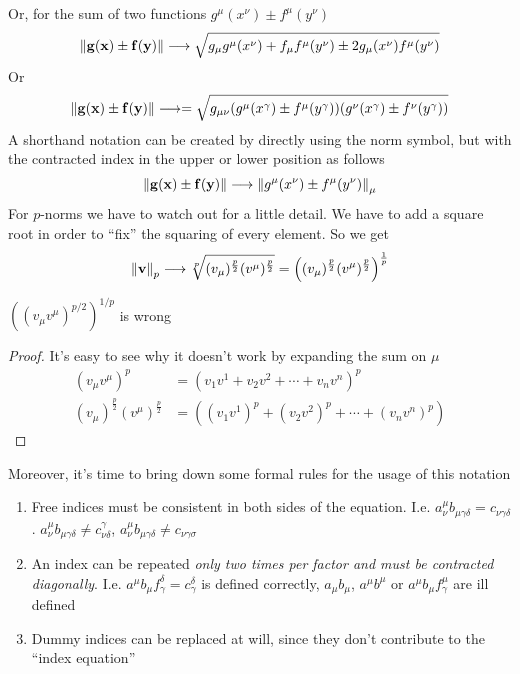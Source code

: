 \documentclass[../complete.tex]{subfiles}
\begin{document}
Or, for the sum of two functions $g^\mu(x^\nu)\pm f^\mu(y^\nu)$
\begin{equation}
	\norm{\mathbf{g}(\mathbf{x})\pm\mathbf{f}(\mathbf{y})}\longrightarrow\sqrt{g_\mu g^\mu(x^\nu)+f_\mu f^\mu(y^\nu)\pm2g_\mu(x^\nu)f^\mu(y^\nu)}	\label{eq:funcsumein}
\end{equation}
Or
\begin{equation*}
	\norm{\mathbf{g}(\mathbf{x})\pm\mathbf{f}(\mathbf{y})}\longrightarrow=\sqrt{g_{\mu\nu}(g^\mu(x^\gamma)\pm f^\mu(y^\gamma))(g^\nu(x^\gamma)\pm f^\nu(y^\gamma))}
\end{equation*}
A shorthand notation can be created by directly using the norm symbol, but with the contracted index in the upper or lower position as follows
\begin{equation}
	\norm{\mathbf{g}(\mathbf{x})\pm\mathbf{f}(\mathbf{y})}\longrightarrow\norm{g^\mu(x^\nu)\pm f^\mu(y^\nu)}_\mu
	\label{eq:normindex}
\end{equation}
For $p$-norms we have to watch out for a little detail. We have to add a square root in order to ``fix'' the squaring of every element. So we get
\begin{equation}
	\norm{\mathbf{v}}_{p}\overset{}{\longrightarrow}\sqrt[p]{(v_\mu)^{\frac{p}{2}} (v^\mu)^{\frac{p}{2}}}=\left( (v_\mu)^{\frac{p}{2}}(v^\mu)^{\frac{p}{2}} \right)^{\frac{1}{p}}
	\label{eq:pnormein}
\end{equation}
\begin{thm}
	$\left( (v_\mu v^\mu)^{p/2} \right)^{1/p}$ is wrong
\end{thm}
\begin{proof}
	It's easy to see why it doesn't work by expanding the sum on $\mu$
	\begin{equation}
		\begin{aligned}
			(v_\mu v^\mu)^p&=\left( v_1v^1+v_2v^2+\cdots+v_nv^n \right)^p\\
			(v_\mu)^{\frac{p}{2}}(v^\mu)^{\frac{p}{2}}&=\left( (v_1v^1)^{p}+(v_2v^2)^p+\cdots+(v_nv^n)^p \right)
		\end{aligned}
		\label{eq:pnormproof}
	\end{equation}
\end{proof}
Moreover, it's time to bring down some formal rules for the usage of this notation
\begin{thm}
	\begin{enumerate}
	\item Free indices must be consistent in both sides of the equation. I.e. $a^\mu_\nu b_{\mu\gamma\delta}=c_{\nu\gamma\delta}$. $a^\mu_\nu b_{\mu\gamma\delta}\ne c^\gamma_{\nu\delta}$, $a^\mu_\nu b_{\mu\gamma\delta}\ne c_{\nu\gamma\sigma}$
	\item An index can be repeated \emph{only two times per factor and must be contracted diagonally}. I.e. $a^\mu b_\mu f^\delta_\gamma=c^\delta_\gamma$ is defined correctly, $a_\mu b_\mu$, $a^\mu b^\mu$ or $a^\mu b_\mu f^\mu_\gamma$ are ill defined
	\item Dummy indices can be replaced at will, since they don't contribute to the ``index equation''
	\end{enumerate}
\end{thm}
\end{document}
